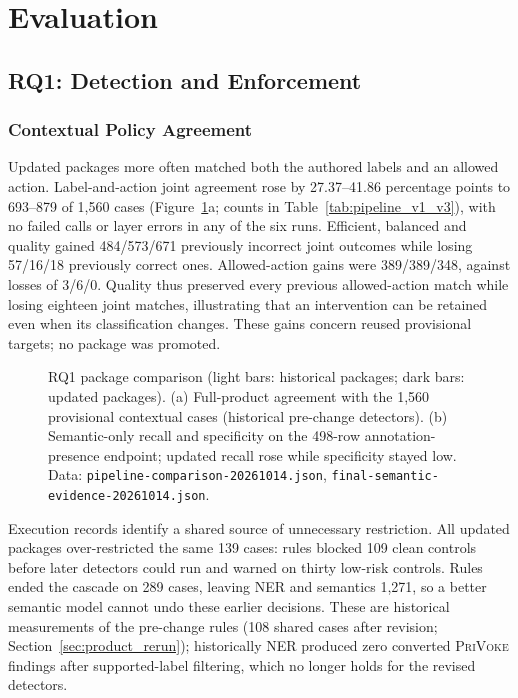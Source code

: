 \documentclass[sigconf]{acmart}
\theoremstyle{acmdefinition}\newtheorem{property}{Property}
\newcommand{\privoke}{\textsc{PriVoke}\xspace}
\begin{document}
\section{Evaluation}
\label{sec:evaluation}
\label{sec:security_eval}
\subsection{RQ1: Detection and Enforcement}
\label{sec:results}
\subsubsection{Contextual Policy Agreement}
\label{sec:pipeline_comparison_results}
Updated packages more often matched both the authored labels and an allowed action. Label-and-action joint agreement rose by 27.37--41.86 percentage points to 693--879 of 1,560 cases (Figure~\ref{fig:rq1}a; counts in Table~\ref{tab:pipeline_v1_v3}), with no failed calls or layer errors in any of the six runs. Efficient, balanced and quality gained 484/573/671 previously incorrect joint outcomes while losing 57/16/18 previously correct ones. Allowed-action gains were 389/389/348, against losses of 3/6/0. Quality thus preserved every previous allowed-action match while losing eighteen joint matches, illustrating that an intervention can be retained even when its classification changes. These gains concern reused provisional targets; no package was promoted.

\begin{figure}[t]
\centering

\caption{RQ1 package comparison (light bars: historical packages; dark bars: updated packages). (a) Full-product agreement with the 1,560 provisional contextual cases (historical pre-change detectors). (b) Semantic-only recall and specificity on the 498-row annotation-presence endpoint; updated recall rose while specificity stayed low. Data: \texttt{pipeline-comparison-20261014.json}, \texttt{final-semantic-evidence-20261014.json}.}
\label{fig:rq1}
\end{figure}

Execution records identify a shared source of unnecessary restriction. All updated packages over-restricted the same 139 cases: rules blocked 109 clean controls before later detectors could run and warned on thirty low-risk controls. Rules ended the cascade on 289 cases, leaving NER and semantics 1,271, so a better semantic model cannot undo these earlier decisions. These are historical measurements of the pre-change rules (108 shared cases after revision; Section~\ref{sec:product_rerun}); historically NER produced zero converted \privoke findings after supported-label filtering, which no longer holds for the revised detectors.
\end{document}
